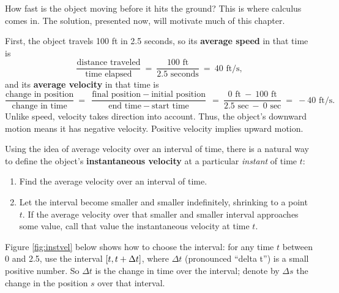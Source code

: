 How fast is the object moving before it hits the ground? This is where
calculus comes in. The solution, presented now, will motivate much of this
chapter.

First, the object travels 100 ft in 2.5 seconds, so its \textbf{average speed}
in that time is
\begin{displaymath}
 \frac{\text{distance traveled}}{\text{time elapsed}} ~=~
 \frac{100 \text{ ft}}{2.5 \text{ seconds}} ~=~ 40 \text{ ft/s,}
\end{displaymath}
and its \textbf{average velocity} in that time is
\begin{displaymath}
 \frac{\text{change in position}}{\text{change in time}} ~=~
 \frac{\text{final position} ~-~ \text{initial position}}
 {\text{end time} ~-~ \text{start time}} ~=~
 \frac{0 \text{ ft} ~-~ 100 \text{ ft}}{2.5 \text{ sec} ~-~ 0 \text{ sec}} ~=~
 -40 \text{ ft/s.}
\end{displaymath}
Unlike speed, velocity takes direction into account. Thus, the object's downward
motion means it has negative velocity. Positive velocity implies upward motion.

\par Using the idea of average velocity over an interval of time, there is a
natural way to define the object's
\textbf{instantaneous velocity}
at a particular \emph{instant} of time $t$:
\begin{enumerate}
 \item Find the average velocity over an interval of time.
 \item Let the interval become smaller and smaller indefinitely, shrinking
  to a point $t$. If the average velocity over that smaller and smaller
  interval approaches some value, call that value the instantaneous velocity
  at time $t$.
\end{enumerate}
Figure \ref{fig:instvel} below shows how to choose the interval: for any
time $t$ between 0 and 2.5, use the interval $\lbrack t,t+\Delta t \rbrack$, where
$\Delta t$ (pronounced ``delta t'') is a small positive number. So $\Delta t$
is the change in time over the interval; denote by $\Delta s$ the change in the
position $s$ over that interval.

